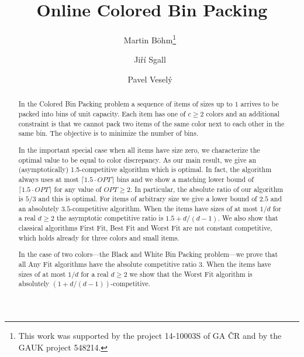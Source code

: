 \documentclass[11pt,a4paper]{article}
\def\vari#1{\mathit{#1}}
\newcommand*\samethanks[1][\value{footnote}]{\footnotemark[#1]}
\begin{document}
\date{}
\title{Online Colored Bin Packing}
\author[1]{Martin B\"{o}hm\thanks{This work was supported by the
project 14-10003S of GA \v{C}R and by the GAUK project 548214.}\ }
\author[1]{Ji\v{r}\'{i} Sgall\samethanks\ }
\author[1]{Pavel Vesel\'{y}\samethanks\ }


\newtheorem*{define}{Definition}
\newtheorem{theorem}{Theorem}[section]
\newtheorem{lemma}[theorem]{Lemma}
\newtheorem{claim}[theorem]{Claim}
\newtheorem{observation}[theorem]{Observation}
\newtheorem{corollary}[theorem]{Corollary}
\newtheorem{proposition}[theorem]{Proposition}

\maketitle

\begin{abstract}
In the Colored Bin Packing problem a sequence of items of sizes up to
$1$ arrives to be packed into bins of unit capacity. Each item has one
of $c\geq 2$ colors and an additional constraint is that we cannot
pack two items of the same color next to each other in the same bin.
The objective is to minimize the number of bins.

In the important special case when all items have size zero, we
characterize the optimal value to be equal to color discrepancy. As
our main result, we give an (asymptotically) 1.5-competitive algorithm
which is optimal. In fact, the algorithm always uses at most
$\lceil1.5\cdot\vari{OPT}\rceil$ bins and we show a matching lower
bound of $\lceil1.5\cdot\vari{OPT}\rceil$ for any value of
$\vari{OPT}\geq 2$.
In particular, the absolute ratio of our algorithm
is $5/3$ and this is optimal.
For items of arbitrary size we give a lower bound of $2.5$
and an absolutely $3.5$-competitive
algorithm.
When the items have sizes of at most $1/d$ for a real $d \geq
2$ the asymptotic competitive ratio is $1.5+d/(d-1)$.
We also show that classical algorithms First Fit, Best Fit and Worst Fit are not
constant competitive, which holds already for three colors and small items.

In the case of two colors---the Black and White Bin Packing
problem---we prove that all Any Fit algorithms have the absolute
competitive ratio $3$. When the items have sizes of at most $1/d$ for a
real $d \geq 2$ we show that the Worst Fit algorithm is absolutely
$(1+d/(d-1))$-competitive.
\end{abstract}
\end{document}
